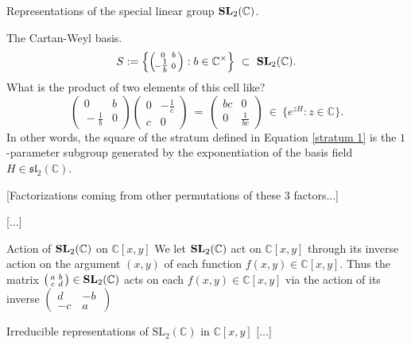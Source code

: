 \documentclass[letterpaper,11pt, reqno]{amsart}
\newtheorem{monodromy theorem}{Monodromy Theorem}[subsection]
\newtheorem{wild conjecture}[theorem]{Wild Conjecture}
\newtheorem{research objectives}{Research objectives}[subsection]
\newtheorem{research question}[theorem]{Research questions}
\newtheorem{aside question}[theorem]{Aside question}
\newtheorem{audio example}[theorem]{\loudspeaker[3] Example}
\newtheorem{blank remark}[theorem]{}
\newtheorem{terminology and comment}[theorem]{Terminology and comment}
\newtheorem{purity hypothesis}[theorem]{Purity hypothesis}
\newtheorem{corollary of the purity hypothesis}[theorem]{Corollary of the purity hypothesis}
\newcommand{\CC} {{\mathbb C}}
\numberwithin{equation}{theorem}
\begin{document}
\begin{section}{Representations of the special linear group $\bold{SL}_{2}(\CC)$.}
\begin{subsection}{The Cartan-Weyl basis.}
	\begin{equation}\label{stratum 1}
	S:=\left\{\left(\begin{smallmatrix} 0 & b \\ \!\!-\tfrac{1}{b} & 0\end{smallmatrix}\right):b\in\CC^\times\right\}
	\ \subset\ 
	\bold{SL}_{2}(\CC).
	\end{equation}
What is the product of two elements of this cell like?
	$$
	\left(\begin{matrix} 0 & b \\ \!\!-\tfrac{1}{b} & 0\end{matrix}\right)
	\left(\begin{matrix} 0 & -\tfrac{1}{c} \\ c & 0\!\!\end{matrix}\right)
	\ =\ \left(\begin{matrix} bc & 0 \\ 0 & \tfrac{1}{bc}\end{matrix}\right)
	\ \in\ \{e^{zH}:z\in\CC\}.
	$$
In other words, the square of the stratum defined in Equation \eqref{stratum 1} is the $1$-parameter subgroup generated by the exponentiation of the basis field $H\in\mathfrak{sl}_{2}(\CC)$.



{\color{red} [Factorizations coming from other permutations of these $3$ factors...]}

{\color{red} [...]}
\end{subsection}

\begin{subsection}{Action of $\bold{SL}_{2}(\CC)$ on $\CC[x,y]$}
We let $\bold{SL}_{2}(\CC)$ act on $\CC[x,y]$ through its inverse action on the argument $(x,y)$ of each function $f(x,y)\in\CC[x,y]$. Thus the matrix $\left(\begin{smallmatrix}a & b\\ c & d\end{smallmatrix}\right)\in\bold{SL}_{2}(\CC)$ acts on each $f(x,y)\in\CC[x,y]$ via the action of its inverse $\left(\begin{smallmatrix}d & -b\ \\ -c\  & a\end{smallmatrix}\right)$
\end{subsection}

\begin{subsection}{Irreducible representations of $\text{SL}_2(\CC)$ in $\CC[x,y]$}
[...]
\end{subsection}


\end{section}
\end{document}

